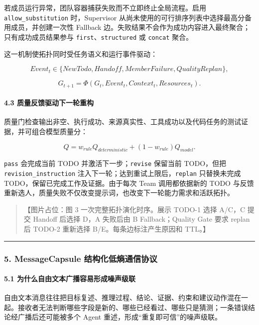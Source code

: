 \documentclass[UTF8,a4paper,12pt]{ctexart}
\begin{document}
若成员运行异常，团队容器捕获失败而不立即终止全局流程。启用 \texttt{allow\_substitution} 时，Supervisor 从尚未使用的可行排序列表中选择最高分备用成员，并创建一次性 Fallback 边。失败结果不会作为成功内容进入最终聚合；只有成功成员结果参与 \texttt{first}、\texttt{structured} 或 \texttt{concat} 聚合。

这一机制使拓扑同时受任务语义和运行事件驱动：

\[
Event_t\in\{NewTodo,Handoff,MemberFailure,QualityReplan\},
\]

\[
G_{t+1}=\Phi(G_t,Event_t,Context_t,Resources_t).
\]

\paragraph{4.3 质量反馈驱动下一轮重构}

质量门检查输出非空、执行成功、来源真实性、工具成功以及代码任务的测试证据，并可组合模型质量分：

\[
Q=w_{rule}Q_{deterministic}+(1-w_{rule})Q_{model}.
\]

\texttt{pass} 会完成当前 TODO 并激活下一步；\texttt{revise} 保留当前 TODO，但把 \texttt{revision\_instruction} 注入下一轮；达到重试上限后，\texttt{replan} 只替换未完成 TODO，保留已完成工作及证据。由于每次 Team 调用都依据新的 TODO 与反馈重新选人，质量失败不仅改变提示词，也改变下一轮能力需求和活跃拓扑。

\begin{quote}
【图片占位：图 3 一次完整拓扑演化时序。展示 TODO-1 选择 A/C，C 提交 Handoff 后选择 D，A 失败后由 B Fallback；Quality Gate 要求 replan 后 TODO-2 重新选择 B/E。每条边标注产生原因和 TTL。】
\end{quote}

\begin{center}\rule{0.5\linewidth}{0.5pt}\end{center}

\subsubsection{5. MessageCapsule 结构化低熵通信协议}

\paragraph{5.1 为什么自由文本广播容易形成噪声级联}

自由文本消息往往把目标复述、推理过程、结论、证据、约束和建议动作混在一起。接收者无法判断哪些字段是新的、哪些已经看过、哪些只是猜测；一条错误结论经广播后还可能被多个 Agent 重述，形成``重复即可信''的噪声级联。
\end{document}
